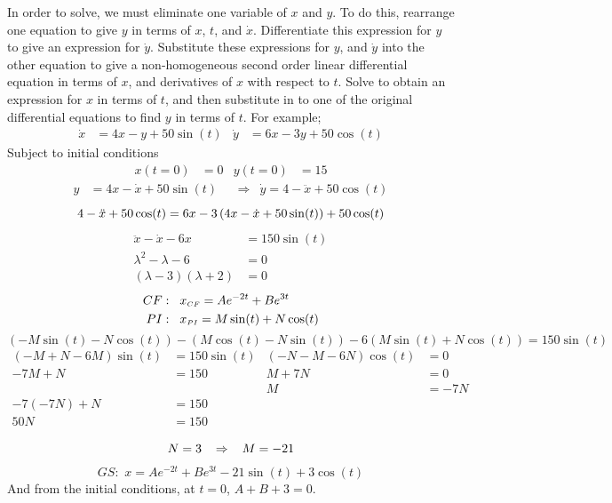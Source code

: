 \documentclass[11pt, a4paper]{article}
\begin{document}
In order to solve, we must eliminate one variable of $x$ and $y$. To do this, rearrange one equation to give $y$ in terms of $x$, $t$, and $\dot{x}$. Differentiate this expression for $y$ to give an expression for $\dot{y}$. Substitute these expressions for $y$, and $\dot{y}$ into the other equation to give a non-homogeneous second order linear differential equation in terms of $x$, and derivatives of $x$ with respect to $t$. Solve to obtain an expression for $x$ in terms of $t$, and then substitute in to one of the original differential equations to find $y$ in terms of $t$. For example;
\begin{align*}
\dot{x}&=4x-y+50\sin(t) &
\dot{y}&=6x-3y+50\cos(t)
\end{align*}
Subject to initial conditions
\begin{align*}
x(t=0)&=0 & y(t=0)&=15
\end{align*}
\begin{align*}
y&=4x-\dot{x}+50\sin(t) & &\Rightarrow & \dot{y} =4-\ddot{x}+50\cos(t)
\end{align*}
\begin{equation*}
4-\ddot{x}+50\cos(t)=6x-3\left(4x-\dot{x}+50\sin(t)\right)+50\cos(t) \\
\end{equation*}
\begin{align*}
\ddot{x}-\dot{x}-6x&=150\sin(t) \\
\lambda^{2}-\lambda-6&=0 \\
(\lambda-3)(\lambda+2)&=0
\end{align*}
\begin{align*}
CF:\hspace{.3cm}&x_{\text{\tiny{$CF$}}}=Ae^{-2t}+Be^{3t} \\
PI:\hspace{.3cm}&x_{\text{\tiny{$PI$}}}=M\sin(t)+N\cos(t)
\end{align*}
\small
\begin{equation*}
(-M\sin(t)-N\cos(t))-(M\cos(t)-N\sin(t))-6(M\sin(t)+N\cos(t))=150\sin(t)
\end{equation*}
\normalsize
\begin{align*}
(-M+N-6M)\sin(t)&=150\sin(t) & (-N-M-6N)\cos(t)&=0 \\
-7M+N&=150 & M+7N&=0 \\
& & M&=-7N \\
-7(-7N)+N&=150 & & \\
50N&=150 & & \\
\end{align*}
\begin{equation*}
N=3 \hspace{.3cm} \Rightarrow \hspace{.3cm} M=-21
\end{equation*}
\begin{equation*}
GS:\,\, x=Ae^{-2t}+Be^{3t}-21\sin(t)+3\cos(t)
\end{equation*}
And from the initial conditions, at $t=0$, $A+B+3=0$. \newline \par
\end{document}
